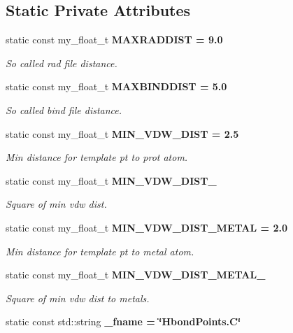 \subsection*{Static Private Attributes}
\begin{CompactItemize}
\item 
static const my\_\-float\_\-t \bf{MAXRADDIST} = 9.0\label{classASCbase_1_1HbondPoints_92890c70651529c4a1614cf1860ee411}

\begin{CompactList}\small\item\em So called rad file distance. \item\end{CompactList}\item 
static const my\_\-float\_\-t \bf{MAXBINDDIST} = 5.0\label{classASCbase_1_1HbondPoints_90584820c666418a18d36d3b8b84e5b8}

\begin{CompactList}\small\item\em So called bind file distance. \item\end{CompactList}\item 
static const my\_\-float\_\-t \bf{MIN\_\-VDW\_\-DIST} = 2.5\label{classASCbase_1_1HbondPoints_d891ae0c548a5c6850c3921581a98bb3}

\begin{CompactList}\small\item\em Min distance for template pt to prot atom. \item\end{CompactList}\item 
static const my\_\-float\_\-t \bf{MIN\_\-VDW\_\-DIST\_}
\begin{CompactList}\small\item\em Square of min vdw dist. \item\end{CompactList}\item 
static const my\_\-float\_\-t \bf{MIN\_\-VDW\_\-DIST\_\-METAL} = 2.0\label{classASCbase_1_1HbondPoints_56639b91eee7ddcb46dc46952accc1e9}

\begin{CompactList}\small\item\em Min distance for template pt to metal atom. \item\end{CompactList}\item 
static const my\_\-float\_\-t \bf{MIN\_\-VDW\_\-DIST\_\-METAL\_}
\begin{CompactList}\small\item\em Square of min vdw dist to metals. \item\end{CompactList}\item 
static const std::string \bf{\_\-fname} = \char`\"{}Hbond\-Points.C\char`\"{}\label{classASCbase_1_1HbondPoints_47f608875e817aa6b3ebf9a3c21b731f}


\end{CompactItemize}
